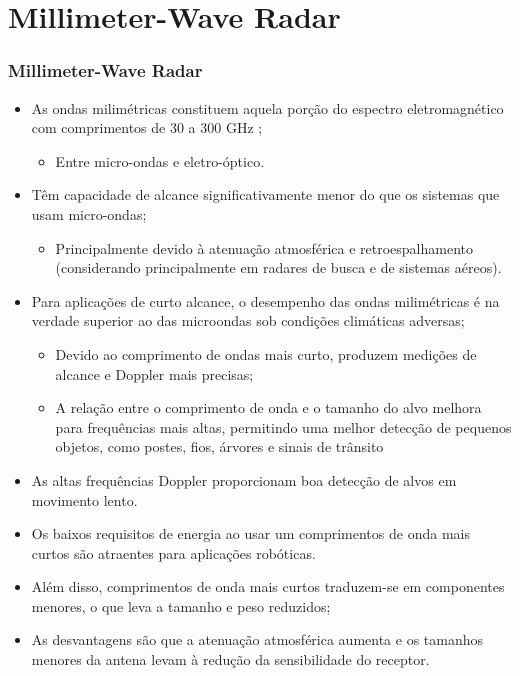 \documentclass[xcolor=dvipsnames, aspectratio=169]{beamer}
\begin{document}
\section[Millimeter-Wave Radar]{Millimeter-Wave Radar} 
\begin{frame}
\frametitle{Millimeter-Wave Radar}
	\begin{itemize}
		\item As ondas milimétricas constituem aquela porção do espectro eletromagnético com comprimentos de 30 a 300 GHz \cite{everett1995sensors};
		\begin{itemize}
            \item Entre micro-ondas e eletro-óptico.
        \end{itemize} 
		\item Têm capacidade de alcance significativamente menor do que os sistemas que usam micro-ondas;
		\begin{itemize}
            \item Principalmente devido à atenuação atmosférica e retroespalhamento (considerando principalmente em radares de busca e de sistemas aéreos).
        \end{itemize}
		\item Para aplicações de curto alcance, o desempenho das ondas milimétricas é na verdade superior ao das microondas sob condições climáticas adversas;
		\begin{itemize}
            \item Devido ao comprimento de ondas mais curto, produzem medições de alcance e Doppler mais precisas;
            \item A relação entre o comprimento de onda e o tamanho do alvo melhora para frequências mais
            altas, permitindo uma melhor detecção de pequenos objetos, como postes, fios, árvores e sinais
            de trânsito
        \end{itemize}
        \item As altas frequências Doppler proporcionam boa detecção de alvos em movimento lento. 
        \item Os baixos requisitos de energia ao usar um comprimentos de onda mais curtos são atraentes para aplicações robóticas. 
        \item Além disso, comprimentos de onda mais curtos traduzem-se em componentes menores, o que leva a tamanho e
        peso reduzidos; 
        \item As desvantagens são que a atenuação atmosférica aumenta e os tamanhos
        menores da antena levam à redução da sensibilidade do receptor.
	\end{itemize}
\end{frame}
\end{document}

